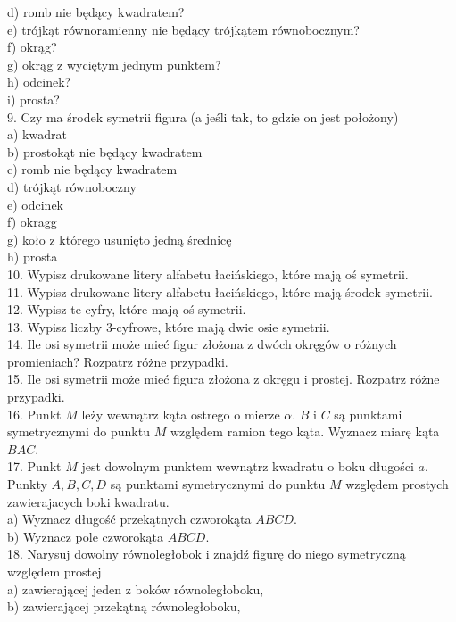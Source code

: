 \documentclass[10pt]{article}
\begin{document}
d) romb nie będący kwadratem?\\
e) trójkąt równoramienny nie będący trójkątem równobocznym?\\
f) okrąg?\\
g) okrąg z wyciętym jednym punktem?\\
h) odcinek?\\
i) prosta?\\
9. Czy ma środek symetrii figura (a jeśli tak, to gdzie on jest położony)\\
a) kwadrat\\
b) prostokąt nie będący kwadratem\\
c) romb nie będący kwadratem\\
d) trójkąt równoboczny\\
e) odcinek\\
f) okragg\\
g) koło z którego usunięto jedną średnicę\\
h) prosta\\
10. Wypisz drukowane litery alfabetu łacińskiego, które mają oś symetrii.\\
11. Wypisz drukowane litery alfabetu łacińskiego, które mają środek symetrii.\\
12. Wypisz te cyfry, które mają oś symetrii.\\
13. Wypisz liczby 3-cyfrowe, które mają dwie osie symetrii.\\
14. Ile osi symetrii może mieć figur złożona z dwóch okręgów o różnych promieniach? Rozpatrz różne przypadki.\\
15. Ile osi symetrii może mieć figura złożona z okręgu i prostej. Rozpatrz różne przypadki.\\
16. Punkt \(M\) leży wewnątrz kąta ostrego o mierze \(\alpha\). \(B\) i \(C\) są punktami symetrycznymi do punktu \(M\) względem ramion tego kąta. Wyznacz miarę kąta \(B A C\).\\
17. Punkt \(M\) jest dowolnym punktem wewnątrz kwadratu o boku długości \(a\). Punkty \(A, B, C, D\) są punktami symetrycznymi do punktu \(M\) względem prostych zawierajacych boki kwadratu.\\
a) Wyznacz długość przekątnych czworokąta \(A B C D\).\\
b) Wyznacz pole czworokąta \(A B C D\).\\
18. Narysuj dowolny równoległobok i znajdź figurę do niego symetryczną względem prostej\\
a) zawierającej jeden z boków równoległoboku,\\
b) zawierającej przekątną równoległoboku,\\
\end{document}
